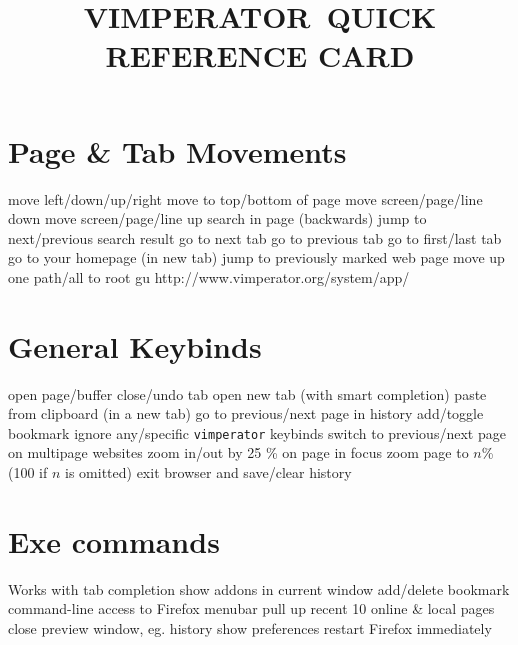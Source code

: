 
\def\content{VIMPERATOR}
\def\versionnumber{1.0}  %


\def\version{v\versionnumber\ \month\ \year}




\title{\uppercase{\content\ quick reference card}}

\shortintro

\vskip 0.5cm

\section{Page \& Tab Movements}{}
	{move left/down/up/right}
	{move to top/bottom of page}
	{move screen/page/line down}
	{move screen/page/line up}
	{search in page (backwards)}
	{jump to next/previous search result}
	{go to next tab}
	{go to previous tab}
	{go to first/last tab}
	{go to your homepage (in new tab)}
	{jump to previously marked web page}
	{move up one path/all to root}
	{gu http://www.vimperator.org/system/app/}

\section{General Keybinds}{}
	{open page/buffer}
	{close/undo tab}
	{open new tab (with smart completion)}
	{paste from clipboard (in a new tab)}
	{go to previous/next page in history}
	{add/toggle bookmark}
	{ignore any/specific {\tt vimperator} keybinds}
\cmdS{\lbracket\lbracket~\rbracket\rbracket}	{switch to previous/next page on multipage websites}
\cmdS{+~-}	{zoom in/out by 25 \% on page in focus}
	{zoom page to $n$\% (100 if $n$ is omitted)}
	{exit browser and save/clear history}
%
\\
%
\section{Exe commands}{Works with tab completion}
	{show addons in current window}
	{add/delete bookmark}
	{command-line access to Firefox menubar}
	{pull up recent 10 online \& local pages}
	{close preview window, eg. history}
	{show preferences}
	{restart Firefox immediately}

